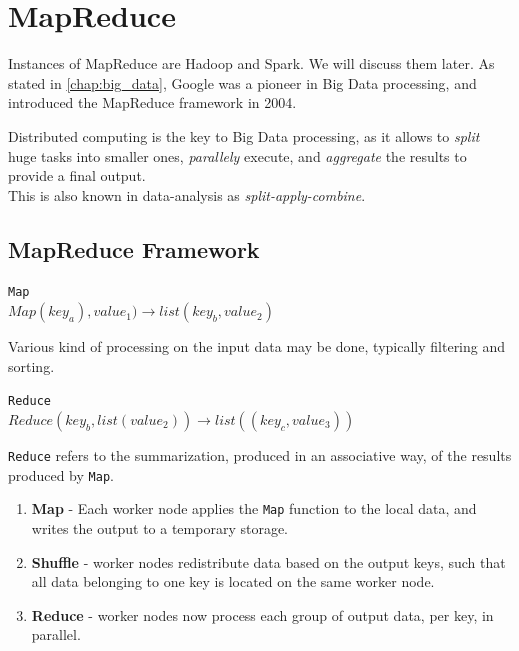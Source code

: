 \chapter{MapReduce}
\label{chap:mapreduce}

Instances of MapReduce are Hadoop and Spark. We will discuss them later.
As stated in \autoref{chap:big_data}, Google was a pioneer in Big Data processing, and introduced the MapReduce framework in 2004.

Distributed computing is the key to Big Data processing, as it allows to \textit{split} huge tasks into smaller ones, \textit{parallely} execute, and \textit{aggregate} the results to provide a final output.\\
This is also known in data-analysis as \textit{split-apply-combine}.

\section{MapReduce Framework}

\begin{paracol}{2}
   \begin{center}
      \texttt{Map}\\
      $Map(key_a), value_1) \rightarrow list(key_b, value_2)$
   \end{center}
   Various kind of processing on the input data may be done, typically filtering and sorting.
   \switchcolumn
   \begin{center}
      \texttt{Reduce}\\
      $Reduce(key_b, list(value_2)) \rightarrow list((key_c,value_3))$
   \end{center}
   \texttt{Reduce} refers to the summarization, produced in an associative way, of the results produced by \lstinline|Map|.
\end{paracol}

\begin{enumerate}
   \item \textbf{Map} - Each worker node applies the \lstinline|Map| function to the local data, and writes the output to a temporary storage.
   \item \textbf{Shuffle} - worker nodes redistribute data based on the output keys, such that all data belonging to one key is located on the same worker node.
   \item \textbf{Reduce} - worker nodes now process each group of output data, per key, in parallel.
\end{enumerate}

